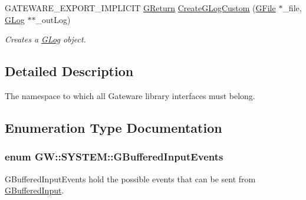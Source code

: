 \begin{DoxyCompactItemize}
G\+A\+T\+E\+W\+A\+R\+E\+\_\+\+E\+X\+P\+O\+R\+T\+\_\+\+I\+M\+P\+L\+I\+C\+IT \hyperlink{namespaceGW_a67a839e3df7ea8a5c5686613a7a3de21}{G\+Return} \hyperlink{namespaceGW_1_1SYSTEM_afe08ea421c9c918ea447ae47b9a631a9}{Create\+G\+Log\+Custom} (\hyperlink{classGW_1_1SYSTEM_1_1GFile}{G\+File} $\ast$\+\_\+file, \hyperlink{classGW_1_1SYSTEM_1_1GLog}{G\+Log} $\ast$$\ast$\+\_\+out\+Log)
\begin{DoxyCompactList}\small\item\em Creates a \hyperlink{classGW_1_1SYSTEM_1_1GLog}{G\+Log} object. \end{DoxyCompactList}\end{DoxyCompactItemize}


\subsection{Detailed Description}
The namespace to which all Gateware library interfaces must belong. 

\subsection{Enumeration Type Documentation}
\subsubsection[{\texorpdfstring{G\+Buffered\+Input\+Events}{GBufferedInputEvents}}]{\setlength{\rightskip}{0pt plus 5cm}enum {\bf G\+W\+::\+S\+Y\+S\+T\+E\+M\+::\+G\+Buffered\+Input\+Events}}\hypertarget{namespaceGW_1_1SYSTEM_a309fd3a92512dd2bfa8065d99c0d7fcb}{}\label{namespaceGW_1_1SYSTEM_a309fd3a92512dd2bfa8065d99c0d7fcb}


G\+Buffered\+Input\+Events hold the possible events that can be sent from \hyperlink{classGW_1_1SYSTEM_1_1GBufferedInput}{G\+Buffered\+Input}. 

